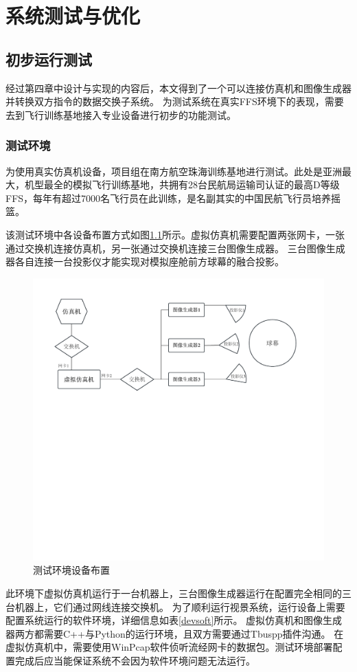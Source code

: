 \chapter{系统测试与优化}
\section{初步运行测试}
经过第四章中设计与实现的内容后，本文得到了一个可以连接仿真机和图像生成器并转换双方指令的数据交换子系统。
为测试系统在真实FFS环境下的表现，需要去到飞行训练基地接入专业设备进行初步的功能测试。
\subsection{测试环境}
为使用真实仿真机设备，项目组在南方航空珠海训练基地进行测试。此处是亚洲最大，机型最全的模拟飞行训练基地，共拥有28台民航局运输司认证的最高D等级FFS，每年有超过7000名飞行员在此训练，是名副其实的中国民航飞行员培养摇篮。
\par
该测试环境中各设备布置方式如图\ref{testenv}所示。虚拟仿真机需要配置两张网卡，一张通过交换机连接仿真机，另一张通过交换机连接三台图像生成器。
三台图像生成器各自连接一台投影仪才能实现对模拟座舱前方球幕的融合投影。
\begin{figure}[h!]
    \begin{center}
        \includegraphics[width=\textwidth]{pictures/testenv.pdf}
        \caption{测试环境设备布置}
        \label{testenv}
    \end{center}
\end{figure}
\par
此环境下虚拟仿真机运行于一台机器上，三台图像生成器运行在配置完全相同的三台机器上，它们通过网线连接交换机。
为了顺利运行视景系统，运行设备上需要配置系统运行的软件环境，详细信息如表\ref{devsoft}所示。
虚拟仿真机和图像生成器两方都需要C++与Python的运行环境，且双方需要通过Tbuspp插件沟通。
在虚拟仿真机中，需要使用WinPcap软件侦听流经网卡的数据包。测试环境部署配置完成后应当能保证系统不会因为软件环境问题无法运行。

